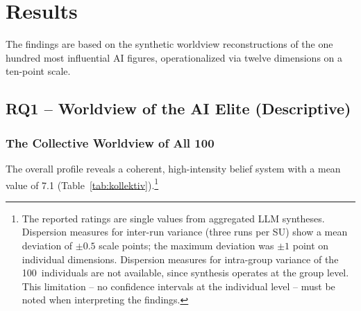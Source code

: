 \documentclass[12pt,a4paper]{article}
\begin{document}
\section{Results}
\label{sec:ergebnisse}

The findings are based on the synthetic worldview reconstructions of the one hundred most influential AI figures, operationalized via twelve dimensions on a ten-point scale.


\subsection{RQ1 -- Worldview of the AI Elite (Descriptive)}
\label{sec:ergebnisse:f1}

\subsubsection{The Collective Worldview of All 100}

The overall profile reveals a coherent, high-intensity belief system with a mean value of 7.1 (Table~\ref{tab:kollektiv}).\footnote{The reported ratings are single values from aggregated LLM syntheses. Dispersion measures for inter-run variance (three runs per SU) show a mean deviation of $\pm 0.5$ scale points; the maximum deviation was $\pm 1$ point on individual dimensions. Dispersion measures for intra-group variance of the 100~individuals are not available, since synthesis operates at the group level. This limitation -- no confidence intervals at the individual level -- must be noted when interpreting the findings.}
\end{document}
